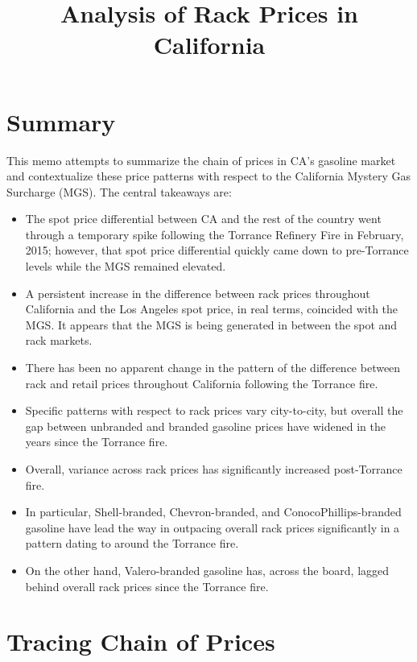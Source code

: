 \documentclass{article}
\begin{document}
\title{Analysis of Rack Prices in California} 

\maketitle

\section{Summary}
This memo attempts to summarize the chain of prices in CA's gasoline market and contextualize these price patterns with respect to the California Mystery Gas Surcharge (MGS). The central takeaways are:
\begin{itemize} 
	\item The spot price differential between CA and the rest of the country went through a temporary spike following the Torrance Refinery Fire in February, 2015; however, that spot price differential quickly came down to pre-Torrance levels while the MGS remained elevated. 
	\item A persistent increase in the difference between rack prices throughout California and the Los Angeles spot price, in real terms, coincided with the MGS. It appears that the MGS is being generated in between the spot and rack markets. 
	\item There has been no apparent change in the pattern of the difference between rack and retail prices throughout California following the Torrance fire.
	\item Specific patterns with respect to rack prices vary city-to-city, but overall the gap between unbranded and branded gasoline prices have widened in the years since the Torrance fire. 
	\item Overall, variance across rack prices has significantly increased post-Torrance fire.
	\item In particular, Shell-branded, Chevron-branded, and ConocoPhillips-branded gasoline have lead the way in outpacing overall rack prices significantly in a pattern dating to around the Torrance fire. 
	\item On the other hand, Valero-branded gasoline has, across the board, lagged behind overall rack prices since the Torrance fire.
\end{itemize} 

\section{Tracing Chain of Prices}
\end{document}
